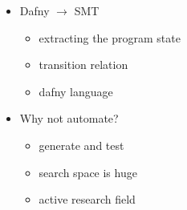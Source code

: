 \begin{frame}
\begin{itemize}
\item<3-> Dafny $\longrightarrow$ SMT

\begin{itemize}

\item extracting the program state

\item transition relation

\item dafny language

\end{itemize}

\item<3-> Why not automate?

\begin{itemize}

\item generate and test

\item search space is huge

\item active research field

\end{itemize}

\end{itemize}

\end{frame}
